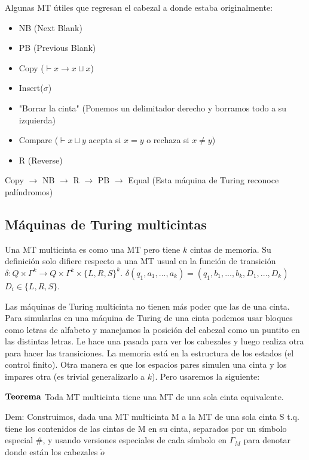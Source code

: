 \documentclass{homework}
\begin{document}
Algunas MT útiles que regresan el cabezal a donde estaba originalmente:
\begin{itemize}
	\item NB (Next Blank)
	\item PB (Previous Blank)
	\item Copy ($\vdash x \rightarrow x \sqcup x$)
	\item Insert($\sigma$)
	\item "Borrar la cinta" (Ponemos un delimitador derecho y borramos todo a su izquierda)
	\item Compare ($\vdash x \sqcup y$ acepta si $x=y$ o rechaza si $x \neq y$)
	\item R (Reverse)
\end{itemize}
Copy $\rightarrow$ NB $\rightarrow$ R $\rightarrow$ PB $\rightarrow$ Equal (Esta máquina de Turing reconoce palíndromos)


\subsection{M\'aquinas de Turing multicintas}
Una MT multicinta es como una MT pero tiene $k$ cintas de memoria. Su definición solo difiere respecto a una MT usual en la función de transición
$\delta : Q \times \Gamma^{k} \rightarrow Q \times \Gamma^{k} \times \{L, R, S\}^{k}$.
$\delta(q_1, a_1,...,a_k) = (q_1,b_1,...,b_k, D_1,...,D_k)$ $D_i \in \{L,R,S\}$.

Las máquinas de Turing multicinta no tienen más poder que las de una cinta.
Para simularlas en una máquina de Turing de una cinta podemos usar bloques como letras de alfabeto y manejamos la posición del cabezal como un puntito en las distintas letras. Le hace una pasada para ver los cabezales y luego realiza otra para hacer las transiciones. La memoria está en la estructura de los estados (el control finito).
Otra manera es que los espacios pares simulen una cinta y los impares otra (es trivial generalizarlo a $k$). Pero usaremos la siguiente:

$\bf{Teorema}$ Toda MT multicinta tiene una MT de una sola cinta equivalente.

Dem: Construimos, dada una MT multicinta M a la MT de una sola cinta S t.q. tiene los contenidos de las cintas de M en su cinta, separados por un símbolo especial $\#$, y usando versiones especiales de cada símbolo en $\Gamma_M$ para denotar donde están los cabezales $\dot{o}$
\end{document}
